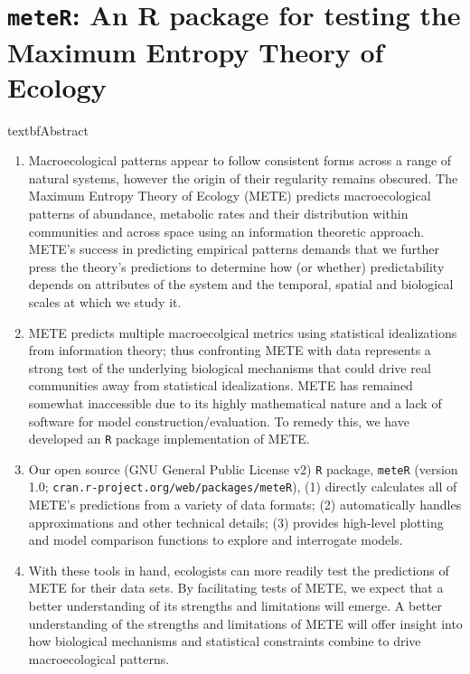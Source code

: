 \chapter{\texttt{meteR}: An R package for testing the Maximum Entropy Theory of Ecology}

\begin{center}
textbf{Abstract}
\end{center}


\begin{enumerate}
\item Macroecological patterns appear to follow consistent forms
  across a range of natural systems, however the origin of their
  regularity remains obscured. The Maximum Entropy Theory of Ecology
  (METE) predicts macroecological patterns of abundance, metabolic
  rates and their distribution within communities and across space
  using an information theoretic approach. METE's success in
  predicting empirical patterns demands that we further press the
  theory's predictions to determine how (or whether) predictability
  depends on attributes of the system and the temporal, spatial and
  biological scales at which we study it.
%
\item METE predicts multiple macroecolgical metrics using statistical
  idealizations from information theory; thus confronting METE with
  data represents a strong test of the underlying biological
  mechanisms that could drive real communities away from statistical
  idealizations. METE has remained somewhat inaccessible due to its
  highly mathematical nature and a lack of software for model
  construction/evaluation. To remedy this, we have developed an
  \texttt{R} package implementation of METE.
%
\item Our open source (GNU General Public License v2) \texttt{R} package,
  \texttt{meteR} (version 1.0;
  \texttt{cran.r-project.org/web/packages/meteR}), (1) directly
  calculates
  all of METE's predictions from a variety of data formats; (2)
  automatically handles approximations and other technical details;
  (3) provides high-level plotting and model comparison functions to
  explore and interrogate models. 
%
\item With these tools in hand, ecologists can more readily test the
  predictions of METE for their data sets. By facilitating tests of
  METE, we expect that a better understanding of its strengths and
  limitations will emerge. A better understanding of the strengths and
  limitations of METE will offer insight into how biological
  mechanisms and statistical constraints combine to drive
  macroecological patterns.

\end{enumerate}

